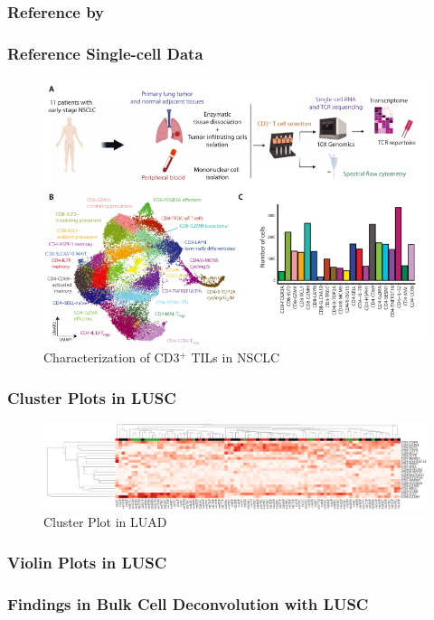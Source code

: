 \documentclass{beamer}
\begin{document}
    \subsubsection{Reference by \protect{}}
    \begin{frame}
        \frametitle{Reference Single-cell Data}

        \begin{figure}
            \includegraphics[width=0.8 \linewidth]{figures/LungCancer/reference_2.png}
            \caption{Characterization of CD3$^+$ TILs in NSCLC \protect\cite{singlecell2}}
        \end{figure}
    \end{frame}

    \begin{frame}
        \frametitle{Cluster Plots in LUSC}

        \begin{figure}
            \includegraphics[width=\linewidth]{figures/BisqueRNA/clustermap/STAR.SQC.GSE162498.cluster.pdf}
            \caption{Cluster Plot in LUAD}
        \end{figure}
    \end{frame}

    \begin{frame}[allowframebreaks]
        \frametitle{Violin Plots in LUSC}
    \end{frame}

    \begin{frame}[allowframebreaks]
        \frametitle{Findings in Bulk Cell Deconvolution with LUSC}
    \end{frame}
\end{document}
